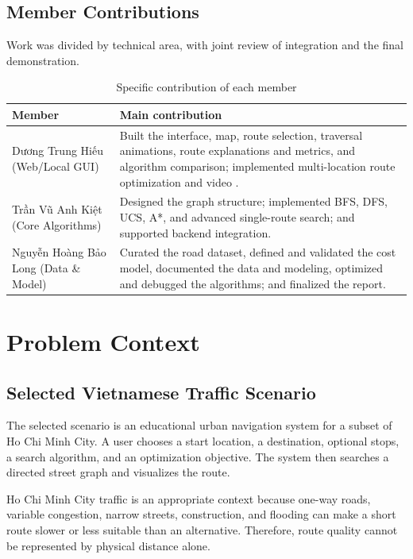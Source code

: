 \documentclass[12pt,a4paper,oneside]{report}
\begin{document}
\section{Member Contributions}
Work was divided by technical area, with joint review of integration and the
final demonstration.

\begin{table}[H]
\centering
\caption{Specific contribution of each member}
\label{tab:contributions}
\small
\begin{tabularx}{\textwidth}{>{\raggedright\arraybackslash}p{4.1cm}X}
\toprule
\textbf{Member} & \textbf{Main contribution}\\
\midrule
Dương Trung Hiếu (Web/Local GUI) & Built the interface, map, route selection, traversal animations, route explanations and metrics, and algorithm comparison; implemented multi-location route optimization and video .\\
Trần Vũ Anh Kiệt (Core Algorithms) & Designed the graph structure; implemented BFS, DFS, UCS, A*, and advanced single-route search;  and supported backend integration.\\
Nguyễn Hoàng Bảo Long (Data \& Model) & Curated the road dataset, defined and validated the cost model, documented the data and modeling, optimized and debugged the algorithms; and finalized the report.\\
\bottomrule
\end{tabularx}
\end{table}

\chapter{Problem Context}

\section{Selected Vietnamese Traffic Scenario}
The selected scenario is an educational urban navigation system for a subset of
Ho Chi Minh City. A user chooses a start location, a destination, optional
stops, a search algorithm, and an optimization objective. The system then
searches a directed street graph and visualizes the route.

Ho Chi Minh City traffic is an appropriate context because one-way roads,
variable congestion, narrow streets, construction, and flooding can make a
short route slower or less suitable than an alternative. Therefore, route
quality cannot be represented by physical distance alone.
\end{document}
